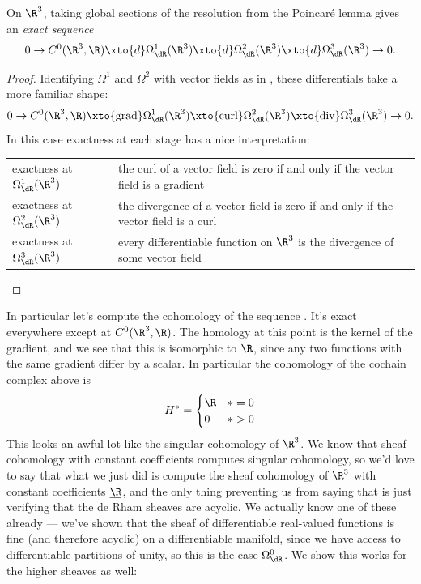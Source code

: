 \documentclass[11pt]{book}
\begin{document}
\begin{proposition} On $\R^3$, taking global sections of the resolution from the Poincar\'e lemma gives an \emph{exact sequence}
\begin{equation}\label{eqn:exact-seq-dR-on-R3}
\begin{aligned}
    0 \to C^0(\R^3,\R) \xto{d} \Omega^1_\dR(\R^3)\xto{d} \Omega^2_\dR(\R^3) \xto{d} \Omega^3_\dR(\R^3) \to 0.
\end{aligned}
\end{equation}
\end{proposition}
\begin{proof} Identifying $\Omega^1$ and $\Omega^2$ with vector fields as in , these differentials take a more familiar shape:
\begin{align*}
    0 \to C^0(\R^3,\R) \xto{\text{grad}} \Omega^1_\dR(\R^3)\xto{\text{curl}} \Omega^2_\dR(\R^3) \xto{\text{div}} \Omega^3_\dR(\R^3) \to 0.
\end{align*}
In this case exactness at each stage has a nice interpretation:
\begin{center}
    \begin{tabular}{| l | p{10cm} |}
    \hline
    exactness at $\Omega^1_\dR(\R^3)$ & the curl of a vector field is zero if and only if the vector field is a gradient \\
    exactness at $\Omega^2_\dR(\R^3)$ & the divergence of a vector field is zero if and only if the vector field is a curl \\
    exactness at $\Omega^3_\dR(\R^3)$ & every differentiable function on $\R^3$ is the divergence of some vector field \\
    \hline
\end{tabular}
\end{center}
\end{proof}
In particular let's compute the cohomology of the sequence . It's exact everywhere except at $C^0(\R^3,\R)$. The homology at this point is the kernel of the gradient, and we see that this is isomorphic to $\R$, since any two functions with the same gradient differ by a scalar. In particular the cohomology of the cochain complex above is
\begin{align*}
    H^\ast = \begin{cases} \R & \ast=0 \\ 0 & \ast>0 \end{cases}
\end{align*}
This looks an awful lot like the singular cohomology of $\R^3$. We know that sheaf cohomology with constant coefficients computes singular cohomology, so we'd love to say that what we just did is compute the sheaf cohomology of $\R^3$ with constant coefficients $\underline{\R}$, and the only thing preventing us from saying that is just verifying that the de Rham sheaves are acyclic. We actually know one of these already --- we've shown that the sheaf of differentiable real-valued functions is fine (and therefore acyclic) on a differentiable manifold, since we have access to differentiable partitions of unity, so this is the case $\Omega^0_\dR$. We show this works for the higher sheaves as well:
\end{document}
